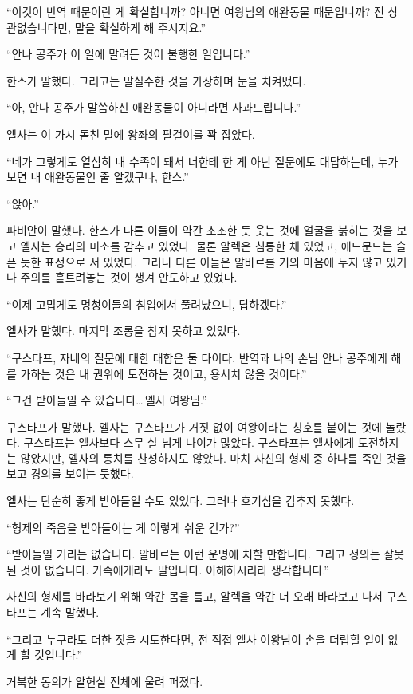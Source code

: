 ``이것이 반역 때문이란 게 확실합니까? 아니면 여왕님의 애완동물 때문입니까? 전 상관없습니다만, 말을 확실하게 해 주시지요.''

``안나 공주가 이 일에 말려든 것이 불행한 일입니다.''

한스가 말했다. 그러고는 말실수한 것을 가장하며 눈을 치켜떴다.

``아, 안나 공주가 말씀하신 애완동물이 아니라면 사과드립니다.''

엘사는 이 가시 돋친 말에 왕좌의 팔걸이를 꽉 잡았다.

``네가 그렇게도 열심히 내 수족이 돼서 너한테 한 게 아닌 질문에도 대답하는데, 누가 보면 내 애완동물인 줄 알겠구나, 한스.''

``앉아.''

파비안이 말했다. 한스가 다른 이들이 약간 초조한 듯 웃는 것에 얼굴을 붉히는 것을 보고 엘사는 승리의 미소를 감추고 있었다. 물론 알렉은 침통한 채 있었고, 에드문드는 슬픈 듯한 표정으로 서 있었다. 그러나 다른 이들은 알바르를 거의 마음에 두지 않고 있거나 주의를 흩트려놓는 것이 생겨 안도하고 있었다.

``이제 고맙게도 멍청이들의 침입에서 풀려났으니, 답하겠다.''

엘사가 말했다. 마지막 조롱을 참지 못하고 있었다.

``구스타프, 자네의 질문에 대한 대합은 둘 다이다. 반역과 나의 손님 안나 공주에게 해를 가하는 것은 내 권위에 도전하는 것이고, 용서치 않을 것이다.''

``그건 받아들일 수 있습니다\ldots\,엘사 여왕님.''

구스타프가 말했다. 엘사는 구스타프가 거짓 없이 여왕이라는 칭호를 붙이는 것에 놀랐다. 구스타프는 엘사보다 스무 살 넘게 나이가 많았다. 구스타프는 엘사에게 도전하지는 않았지만, 엘사의 통치를 찬성하지도 않았다. 마치 자신의 형제 중 하나를 죽인 것을 보고 경의를 보이는 듯했다.

엘사는 단순히 좋게 받아들일 수도 있었다. 그러나 호기심을 감추지 못했다.

``형제의 죽음을 받아들이는 게 이렇게 쉬운 건가?''

``받아들일 거리는 없습니다. 알바르는 이런 운명에 처할 만합니다. 그리고 정의는 잘못된 것이 없습니다. 가족에게라도 말입니다. 이해하시리라 생각합니다.''

자신의 형제를 바라보기 위해 약간 몸을 틀고, 알렉을 약간 더 오래 바라보고 나서 구스타프는 계속 말했다.

``그리고 누구라도 더한 짓을 시도한다면, 전 직접 엘사 여왕님이 손을 더럽힐 일이 없게 할 것입니다.''

거북한 동의가 알현실 전체에 울려 퍼졌다.

